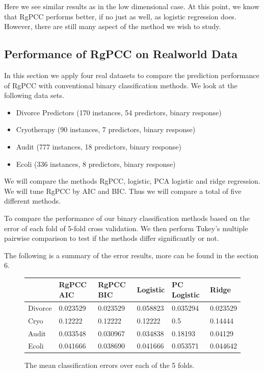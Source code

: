 \documentclass[main.tex]{subfiles}
\begin{document}
Here we see similar results as in the low dimensional case. At this point, we know that RgPCC performs better, if no just as well, as logistic regression does. However, there are still many aspect of the method we wish to study.

\subsection{Performance of RgPCC on Realworld Data}

In this section we apply four real datasets to compare the prediction performance of RgPCC with conventional binary classification methods. We look at the following data sets.
\begin{itemize}
    \item Divorce Predictors (170 instances, 54 predictors, binary response)
    \item Cryotherapy (90 instances, 7 predictors, binary response)
    \item Audit (777 instances, 18 predictors, binary response)
    \item Ecoli (336 instances, 8 predictors, binary response)
\end{itemize}

We will compare the methods RgPCC, logistic, PCA logistic and ridge regression. We will tune RgPCC by AIC and BIC. Thus we will compare a total of five different methods. 

To compare the performance of our binary classification methods based on the error of each fold of 5-fold cross validation. We then perform Tukey's multiple pairwise comparison to test if the methods differ significantly or not.

The following is a summary of the error results, more can be found in the section 6.

\begin{figure}[H]
	\begin{tabular}{l | l l l l l} \hline
    & RgPCC AIC & RgPCC BIC & Logistic & PC Logistic & Ridge \\ \hline
    \rowcolor{LightCyan}
    Divorce & 0.023529 & 0.023529 & 0.058823 & 0.035294 & 0.023529\\
    Cryo & 0.12222 & 0.12222 & 0.12222         &  0.5 & 0.14444 \\
    \rowcolor{LightCyan}
    Audit & 0.033548 & 0.030967 & 0.034838    & 0.18193 & 0.04129\\
    Ecoli & 0.041666 & 0.038690 & 0.041666  & 0.053571 & 0.044642\\ \hline
	\end{tabular}
	\caption{The mean classification errors over each of the 5 folds.}
\end{figure}
\end{document}
